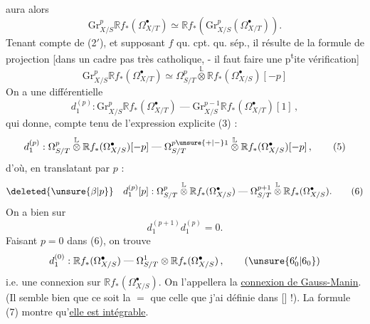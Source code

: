 aura alors
\[
 \mathrm{Gr}^p_{X/S}\mathbb R f_*(\Omega^\bullet_{X/T})\simeq\mathbb R f_*(\mathrm{Gr}^p_{X/S}(\Omega^\bullet_{X/T})) .
\]
Tenant compte de (2$'$), et supposant $f$ qu. cpt. qu. sép., il résulte  de la formule de projection [dans un cadre pas très catholique, - il faut faire une p\textsuperscript{t}ite vérification]
\[
 \mathrm{Gr}^p_{X/S}\mathbb R f_*(\Omega^\bullet_{X/T})\simeq\Omega^p_{S/T}\overset{\mathbb L}{\otimes}\mathbb R f_*(\Omega^\bullet_{X/S})[-p] \tag*{(3)}
\]
On a  une différentielle
\[
 d_1^{(p)}:\mathrm{Gr}^p_{X/S}\mathbb R f_*(\Omega^\bullet_{X/T})\mathrel{\text{---}}\mathrm{Gr}^{p-1}_{X/S}\mathbb R f_*(\Omega^\bullet_{X/T})[1] \,, \tag*{(4)}
\]
qui donne, compte tenu de l'expression explicite (3) :
\[
 d_1^{(p)}:\Omega^p_{S/T}\overset{\mathbb L}{\otimes}\mathbb R f_*(\Omega^\bullet_{X/S})[-p]\mathrel{\text{---}}\Omega^{p\unsure{+|-}1}_{S/T}\overset{\mathbb L}{\otimes}\mathbb R f_*(\Omega^\bullet_{X/S})[-p] \,, \tag*{(5)}
\]
d'où, en translatant par $p$ :
\[
 \deleted{\unsure{\beta|p}}\quad d_1^{(p)}[p]:\Omega^p_{S/T}\overset{\mathbb L}{\otimes}\mathbb R f_*(\Omega^\bullet_{X/S})\mathrel{\text{---}}\Omega^{p+1}_{S/T}\overset{\mathbb L}{\otimes}\mathbb R f_*(\Omega^\bullet_{X/S}). \tag*{(6)}
\]
On a bien sur
\[
 d_1^{(p+1)}d_1^{(p)}=0 . \tag*{(7)}
\]
Faisant $p=0$ dans (6), on trouve
\[
 d_1^{(0)}:\mathbb R f_*(\Omega^\bullet_{X/S})\mathrel{\text{---}}\Omega^1_{S/T}\otimes\mathbb R f_*(\Omega^\bullet_{X/S}) \,, \tag*{$(\unsure{6_0'|6_0})$}
\]
i.e. une connexion sur $\mathbb R f_*(\Omega^\bullet_{X/S})$.  On l'appellera la \uline{connexion de Gauss-Manin}. (Il semble bien que ce soit la $=$ que celle que j'ai définie dans [\enspace] !). La formule (7) montre qu'\uline{elle est intégrable}.
